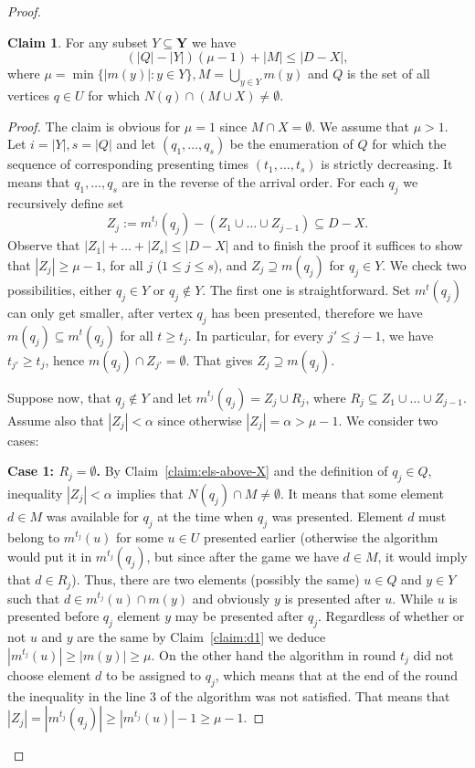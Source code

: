 \documentclass[12pt]{amsart}
\renewcommand{\leq}{\leqslant}
\renewcommand{\geq}{\geqslant}
\theoremstyle{definition}
\newtheorem{claim}[theorem]{Claim}
\newcommand{\abs}[1]{\left\vert#1\right\vert}
\begin{document}
\begin{proof}
\begin{claim}\label{claim:main-ineq}
For any subset $Y\subseteq \mathbf Y$  we have
$$(\abs{Q}-\abs{Y})(\mu - 1) + \abs{M}  \leq \abs{D-X},$$
where $\mu= \min\{\abs{m(y)} : y \in Y\}, M=\bigcup_{y\in Y} m(y)$ and $Q$ is the set of all vertices $q\in U$ for which $N(q) \cap (M\cup X) \neq \emptyset$. 
\end{claim}
\begin{proof}
The claim is obvious for $\mu=1$ since $M\cap X = \emptyset$.
We assume that $\mu>1$.
Let $i=\abs{Y}, s=\abs{Q}$ and let $(q_1, \ldots, q_s)$ be the enumeration of $Q$ for which the sequence of corresponding presenting times $(t_1, \ldots, t_s)$ is strictly decreasing.
It means that $q_1,\ldots,q_s$ are in the reverse of the arrival order.
For each $q_j$ we recursively define  set $$Z_j:=m^{t_j}(q_j)-(Z_1\cup\ldots\cup Z_{j-1})\subseteq D-X.$$ 
Observe that $\abs{Z_1}+\ldots+\abs{Z_s}\leq \abs{D-X}$ and to finish the proof it suffices to show that $\abs{Z_j}\geq \mu - 1$, for all $j$ ($1\leq j\leq s$), and $Z_j \supseteq m(q_j)$ for $q_j\in Y$. We check two possibilities, either $q_j\in Y$ or $q_j\notin Y$.
The first one is straightforward.
Set $m^t(q_j)$ can only get smaller, after  vertex $q_j$ has been presented, therefore we have $m(q_j)\subseteq m^t(q_j)$ for all $t\geq t_j$. 
In particular, for every $j'\leq j-1$, we have $t_{j'} \geq t_j$, hence $m(q_j) \cap Z_{j'} = \emptyset$. That gives $Z_j \supseteq m(q_j)$.


Suppose now, that $q_j\notin Y$ and let $m^{t_j}(q_j)=Z_j\cup R_j$, where $R_j\subseteq Z_1\cup\ldots\cup Z_{j-1}$. 
Assume also that $\abs{Z_j}<\alpha$ since otherwise $\abs{Z_j}=\alpha>\mu-1$.
We consider two cases:

\textbf{Case 1: $R_j=\emptyset$.}
By Claim~\ref{claim:els-above-X} and the definition of $q_j\in Q$, inequality $\abs{Z_j}<\alpha$ implies that $N(q_j)\cap M\neq\emptyset$.
It  means that some element $d\in M$ was available for $q_j$ at the time when $q_j$ was presented. 
Element $d$ must belong to $m^{t_j}(u)$ for some $u\in U$ presented earlier 
(otherwise the algorithm would put it in $m^{t_j}(q_j)$, but since after the game we have  $d\in M$, it would  imply that $d\in R_j$). 
Thus, there are two elements (possibly the same) $u\in Q$ and $y\in Y$ such that $d\in m^{t_j}(u) \cap m(y)$ and obviously $y$ is presented after $u$.
While $u$ is presented before $q_j$ element $y$ may be presented after $q_j$.
Regardless of whether or not $u$ and $y$ are the same
by Claim~\ref{claim:d1} we deduce $\abs{m^{t_j}(u)} \geq \abs{m(y)} \geq \mu $. 
On the other hand the algorithm in round $t_j$  did not choose element $d$ to be assigned to $q_j$, which means that at the end of the round the inequality in the line 3 of the algorithm was not satisfied. 
That means that $\abs{Z_j}=\abs{m^{t_j}(q_j)} \geq \abs{m^{t_j}(u)}-1 \geq \mu -1$.


\end{proof}
\end{proof}
\end{document}
